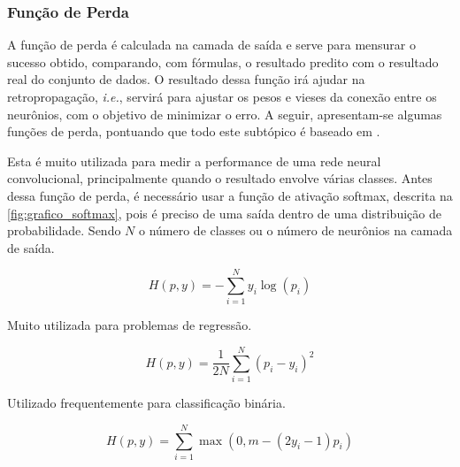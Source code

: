 \subsubsection*{Função de Perda}

A função de perda é calculada na camada de saída e serve para mensurar o sucesso obtido, comparando, com fórmulas, o resultado predito com o resultado real do conjunto de dados. O resultado dessa função irá ajudar na retropropagação, \emph{i.e.}, servirá para ajustar os pesos e vieses da conexão entre os neurônios, com o objetivo de minimizar o erro. A seguir, apresentam-se algumas funções de perda, pontuando que todo este subtópico é baseado em .


Esta é muito utilizada para medir a performance de uma rede neural convolucional, principalmente quando o resultado envolve várias classes. Antes dessa função de perda, é necessário usar a função de ativação softmax, descrita na \cref{fig:grafico_softmax}, pois é preciso de uma saída dentro de uma distribuição de probabilidade. Sendo \( N \) o número de classes ou o número de neurônios na camada de saída.

\begin{equation} 
    H(p,y) = -\sum_{i=1}^{N} y_i \log(p_i)
\end{equation}



Muito utilizada para problemas de regressão.

\begin{equation}
    H(p,y) = \frac{1}{2N} \sum_{i=1}^{N} (p_i - y_i)^2
\end{equation}


Utilizado frequentemente para classificação binária.

\begin{equation}
    H(p,y) = \sum_{i=1}^{N} \max(0, m - (2y_i - 1) p_i)
\end{equation}
